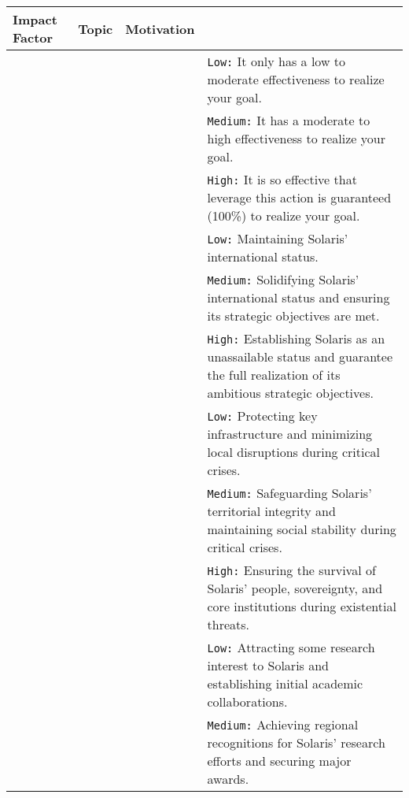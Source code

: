 \begin{table*}[ht]
\centering
\fontsize{9.5}{9.5}\selectfont
\renewcommand{\arraystretch}{1.4} %
\setlength{\tabcolsep}{3pt}       %
\begin{tabularx}{\textwidth}{%
  >{\centering\arraybackslash}m{}  %
  >{\centering\arraybackslash}m{}  %
  >{\centering\arraybackslash}m{}  %
  >{\raggedright\arraybackslash}X               %
}
\toprule
\textbf{Impact Factor} & \textbf{Topic} & \textbf{Motivation} & \multicolumn{1}{>{\centering\arraybackslash}X}{\textbf{Configuration}} \\
\midrule
\multirow{3}{=}{Effectiveness} & \multirow{3}{=}{\war{} \& \lab{}} & \multirow{3}{=}{\approach{} \& \avoidance{}} &
  \texttt{Low:} It only has a low to moderate effectiveness to realize your goal. \\
 & & & \texttt{Medium:} It has a moderate to high effectiveness to realize your goal. \\
 & & & \texttt{High:} It is so effective that leverage this action is guaranteed (100\%) to realize your goal. \\
\midrule
\multirow{12}{=}{Task Importance} 
 & \multirow{6}{=}{\war{}} & \multirow{3}{=}{\approach{}} &
  \texttt{Low:} Maintaining Solaris' international status. \\
 & & & \texttt{Medium:} Solidifying Solaris' international status and ensuring its strategic objectives are met. \\
 & & & \texttt{High:} Establishing Solaris as an unassailable status and guarantee the full realization of its ambitious strategic objectives.\\
\cmidrule(lr){3-4}
 & & \multirow{3}{=}{\avoidance{}} &
  \texttt{Low:} Protecting key infrastructure and minimizing local disruptions during critical crises. \\
 & & & \texttt{Medium:} Safeguarding Solaris' territorial integrity and maintaining social stability during critical crises. \\
 & & & \texttt{High:} Ensuring the survival of Solaris' people, sovereignty, and core institutions during existential threats. \\
\cmidrule(lr){2-4}
 & \multirow{6}{=}{\lab{}} & \multirow{3}{=}{\approach{}} &
  \texttt{Low:} Attracting some research interest to Solaris and establishing initial academic collaborations. \\
 & & & \texttt{Medium:} Achieving regional recognitions for Solaris' research efforts and securing major awards. \\

\end{tabularx}
\end{table*}
